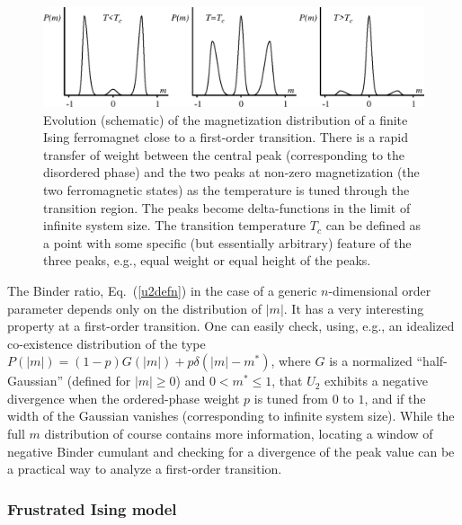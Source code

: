 \documentclass[draft,numberedheadings]{aipproc}
\begin{document}
\begin{figure}
\includegraphics[width=14cm, clip]{mdistfirst.eps}
\caption{Evolution (schematic) of the magnetization distribution of a finite Ising ferromagnet close to a first-order transition. There is 
a rapid transfer of weight between the central peak (corresponding to the disordered phase) and the two peaks at non-zero magnetization (the 
two ferromagnetic states) as the temperature is tuned through the transition region. The peaks become delta-functions in the limit of infinite 
system size. The transition temperature $T_c$ can be defined as a point with some specific (but essentially arbitrary) feature of the three peaks, 
e.g., equal weight or equal height of the peaks.}
\label{mdistfirst}
\end{figure}

The Binder ratio, Eq.~(\ref{u2defn}) in the case of a generic $n$-dimensional order parameter depends only on the distribution of $|m|$. It has a very
interesting property at a first-order transition. One can easily check, using, e.g., an idealized co-existence distribution of the type 
$P(|m|)=(1-p)G(|m|)+p\delta(|m|-m^*)$, where $G$ is a normalized ``half-Gaussian'' (defined for $|m|\ge 0$) and $0< m^* \le 1$, 
that $U_2$ exhibits a negative divergence when the ordered-phase weight $p$ is tuned from $0$ to $1$, and if the width of the Gaussian vanishes 
(corresponding to infinite system size). While the full $m$ distribution of course contains more information, locating a window of negative Binder cumulant 
and checking for a divergence of the peak value can be a practical way to analyze a first-order transition. 

\subsubsection{Frustrated Ising model}
\label{j1j2ising}
\end{document}
